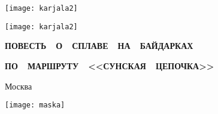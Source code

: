 \begin{titlepage}
	\newpage
	\begin{center}
		\Large \textbf \MyVarAuthorName
	\end{center}	
	\vspace{0.75cm}	
	\begin{center}
	\texttt{[image: karjala2]}%
	\end{center}	
	\begin{center}
		\Huge{}
	\end{center}	
%
	\begin{center}
	\texttt{[image: karjala2]}%
	\end{center}
%
	\begin{center}
		\footnotesize
%	
		{
		\textbf{ПОВЕСТЬ~~О~~СПЛАВЕ~~НА~~БАЙДАРКАХ}}
		
		{
		\textbf{ПО~~МАРШРУТУ~~<<СУНСКАЯ~~ЦЕПОЧКА>>}}		
	\end{center}
%
	\vspace{\fill}	
	\begin{center}\normalsize Москва\end{center}
	\vspace{-1.1cm}
	\begin{center}\texttt{[image: maska]}\end{center}
	\vspace{-1.24cm}
	\begin{center}\normalsize \year\end{center}	
\end{titlepage}